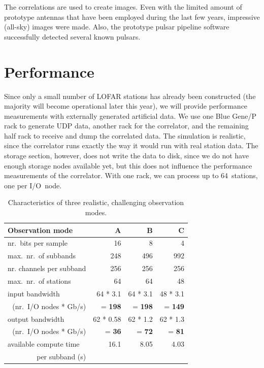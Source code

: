 \documentclass{sig-alternate}
\begin{document}
The correlations are used to create images.
Even with the limited amount of prototype antennas that have been employed
during the last few years, impressive (all-sky) images were made.
Also, the prototype pulsar pipeline software successfully detected several
known pulsars.



\section{Performance}

Since only a small number of LOFAR stations has already been constructed
(the majority will become operational later this year), we will provide 
performance measurements with externally generated artificial data.
We use one Blue Gene/P rack to generate UDP data, another rack for the
correlator, and the remaining half rack to receive and dump the correlated
data.
The simulation is realistic, since the correlator runs exactly
the way it would run with real station data.
The storage section, however, does not write the data to disk, since we do
not have enough storage nodes available yet, but this does not influence the
performance measurements of the correlator.
With one rack, we can process up to 64~stations, one per I/O~node.

\begin{table}[ht]
\begin{center}
\begin{tabular}{|l|rrr|}
\hline
Observation mode	 & \textsf{A}	& \textsf{B}	& \textsf{C}	\\
\hline
nr.\ bits per sample	 & 16		& 8		& 4	\\
max.\ nr.\ of subbands	 & 248		& 496		& 992	\\
nr. channels per subband & 256		& 256		& 256	\\
max.\ nr.\ of stations	 & 64		& 64		& 48	\\
\hline
input bandwidth & 64 * 3.1  & 64 * 3.1 & 48 * 3.1 \\
\multicolumn{1}{|r|}{(nr.\ I/O nodes * Gb/s)} & = \textbf{198} & = \textbf{198} & = \textbf{149} \\
output bandwidth & 62 * 0.58 & 62 * 1.2 & 62 * 1.3 \\
\multicolumn{1}{|r|}{(nr.\ I/O nodes * Gb/s)}  & = \textbf{36} & = \textbf{72} & = \textbf{81} \\
\hline
available compute time	 & 16.1	     & 8.05     & 4.03     \\
\multicolumn{1}{|r|}{per subband (s)}	 & & & \\
\hline
\end{tabular}
\end{center}
\caption{Characteristics of three realistic, challenging observation modes.}
\label{tab:observation-characteristics}
\end{table}
\end{document}
